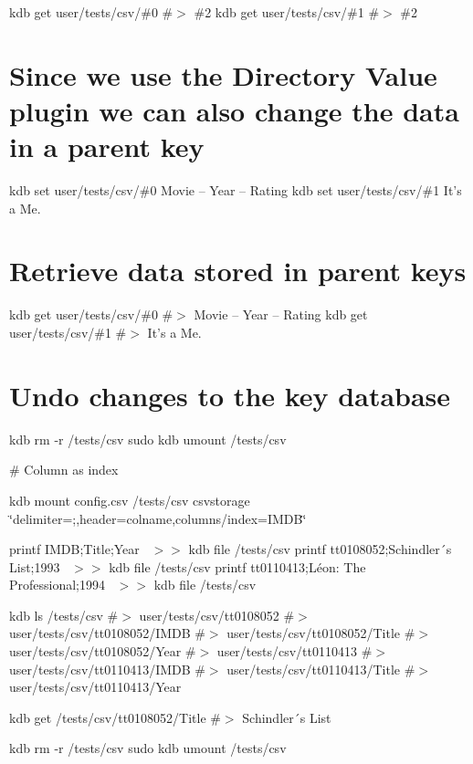 kdb get user/tests/csv/\#0 \#$>$ \#2 kdb get user/tests/csv/\#1 \#$>$ \#2

\section*{Since we use the Directory Value plugin we can also change the data in a parent key}

kdb set user/tests/csv/\#0 \textquotesingle{}Movie – Year – Rating\textquotesingle{} kdb set user/tests/csv/\#1 \textquotesingle{}It’s a Me.\textquotesingle{}

\section*{Retrieve data stored in parent keys}

kdb get user/tests/csv/\#0 \#$>$ Movie – Year – Rating kdb get user/tests/csv/\#1 \#$>$ It’s a Me.

\section*{Undo changes to the key database}

kdb rm -\/r /tests/csv sudo kdb umount /tests/csv 
\begin{DoxyCode}
# Column as index
\end{DoxyCode}
 kdb mount config.\+csv /tests/csv csvstorage \char`\"{}delimiter=;,header=colname,columns/index=\+I\+M\+D\+B\char`\"{}

printf \textquotesingle{}I\+M\+DB;Title;Year~\newline
\textquotesingle{} $>$$>$ {\ttfamily kdb file /tests/csv} printf \textquotesingle{}tt0108052;Schindler´s List;1993~\newline
\textquotesingle{} $>$$>$ {\ttfamily kdb file /tests/csv} printf \textquotesingle{}tt0110413;Léon\+: The Professional;1994~\newline
\textquotesingle{} $>$$>$ {\ttfamily kdb file /tests/csv}

kdb ls /tests/csv \#$>$ user/tests/csv/tt0108052 \#$>$ user/tests/csv/tt0108052/\+I\+M\+DB \#$>$ user/tests/csv/tt0108052/\+Title \#$>$ user/tests/csv/tt0108052/\+Year \#$>$ user/tests/csv/tt0110413 \#$>$ user/tests/csv/tt0110413/\+I\+M\+DB \#$>$ user/tests/csv/tt0110413/\+Title \#$>$ user/tests/csv/tt0110413/\+Year

kdb get /tests/csv/tt0108052/\+Title \#$>$ Schindler´s List

kdb rm -\/r /tests/csv sudo kdb umount /tests/csv


